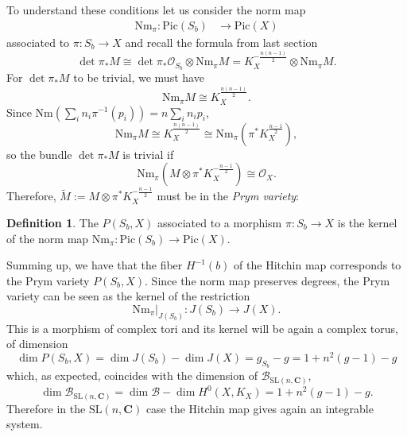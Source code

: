 \documentclass[12pt,a4paper]{book}
\theoremstyle{definition} \newtheorem{defn}[thm]{Definition}
\theoremstyle{definition} \newtheorem{ejemplo}[thm]{Example}
\theoremstyle{remark} \newtheorem{rem}[thm]{Remark}
\def\OO{\mathscr{O}}
\def\BB{\mathscr{B}}
\def\CC{\mathbf{C}}
\def\Nm{\mathrm{Nm}}
\def\SL{\mathrm{SL}}
\def\Pic{\mathrm{Pic}}
\let\emph\relax
\begin{document}
To understand these conditions let us consider the norm map
  \begin{align*}
     \Nm_\pi: \Pic(S_b)&\longrightarrow \Pic(X)
    \end{align*}
    associated to $\pi:S_b\rightarrow X$ and recall the formula from last section
    \begin{equation*}
      \det \pi_*M \cong \det \pi_*\OO_{S_b} \otimes \Nm_\pi M=K_X^{-\frac{n(n-1)}{2}} \otimes \Nm_\pi M.
    \end{equation*}
    For $\det \pi_*M$ to be trivial, we must have
    \begin{equation*}
      \Nm_\pi M \cong K_X^{\frac{n(n-1)}{2}}.
    \end{equation*}
    Since $\Nm(\sum_i n_i\pi^{-1}(p_i))=n\sum_i n_ip_i$, 
    \begin{equation*}
      \Nm_\pi M \cong K_X^{\frac{n(n-1)}{2}} \cong \Nm_\pi\left(\pi^*K_X^{\frac{n-1}{2}}\right),
    \end{equation*}
    so the bundle $\det \pi_*M$ is trivial if
    \begin{equation*}
      \Nm_\pi \left(M\otimes \pi^*K_X^{-\frac{n-1}{2}}\right) \cong \OO_X.
    \end{equation*}
    Therefore, $\widetilde{M}:=M\otimes \pi^*K_X^{-\frac{n-1}{2}}$ must be in the \textit{Prym variety}:
    \begin{defn}
      The \emph{Prym variety} $P(S_b,X)$ associated to a morphism $\pi:S_b \rightarrow X$ is the kernel of the norm map $\Nm_\pi:\Pic(S_b) \rightarrow \Pic(X)$.
    \end{defn}
    Summing up, we have that the fiber $H^{-1}(b)$ of the Hitchin map corresponds to the Prym variety $P(S_b,X)$. Since the norm map preserves degrees, the Prym variety can be seen as the kernel of the restriction
    \begin{equation*}
      \Nm_\pi |_{J(S_b)}: J(S_b) \longrightarrow J(X).
    \end{equation*}
    This is a morphism of complex tori and its kernel will be again a complex torus, of dimension
    \begin{equation*}
      \dim P(S_b,X)= \dim J(S_b) - \dim J(X)= g_{S_b} - g = 1+n^2(g-1) -g
    \end{equation*}
    which, as expected, coincides with the dimension of $\BB_{\SL(n,\CC)}$,
    \begin{equation*}
      \dim \BB_{\SL(n,\CC)}= \dim \BB - \dim H^0(X,K_X)= 1+n^2(g-1)-g.
    \end{equation*}
    Therefore in the $\SL(n,\CC)$ case the Hitchin map gives again an integrable system.
\end{document}
